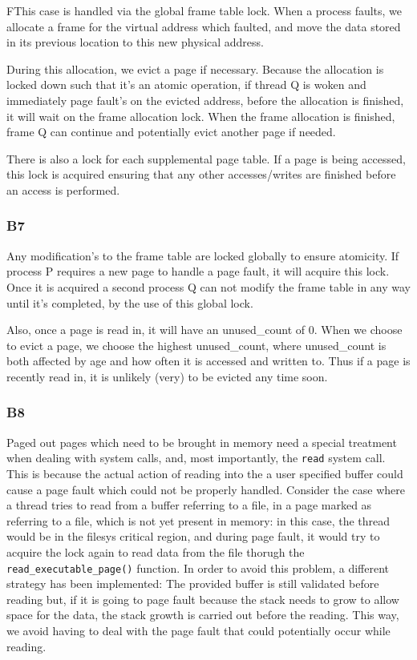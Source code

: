 \documentclass[a4wide, 11pt]{article}
\newcommand{\tx}{\texttt}
\begin{document}
FThis case is handled via the global frame table lock. When a process faults, we allocate a frame for the virtual address which faulted, and move the data stored in its previous location to this new physical address.

During this allocation, we evict a page if necessary. Because the allocation is locked down such that it's an atomic operation, if thread Q is woken and immediately page fault's on the evicted address, before the allocation is finished, it will wait on the frame allocation lock. When the frame allocation is finished, frame Q can continue and potentially evict another page if needed.

There is also a lock for each supplemental page table. If a page is being accessed, this lock is acquired ensuring that any other accesses/writes are finished before an access is performed.

\subsubsection{B7}

Any modification's to the frame table are locked globally to ensure atomicity. If process P requires a new page to handle a page fault, it will acquire this lock. Once it is acquired a second process Q can not modify the frame table in any way until it's completed, by the use of this global lock.

Also, once a page is read in, it will have an unused\_count of 0. When we choose to evict a page, we choose the highest unused\_count, where unused\_count is both affected by age and how often it is accessed and written to. Thus if a page is recently read in, it is unlikely (very) to be evicted any time soon.

\subsubsection{B8}
Paged out pages which need to be brought in memory need a special treatment when dealing with system calls, and, most importantly, the \tx{read} system call. This is because the actual action of reading into the a user specified buffer could cause a page fault which could not be properly handled. Consider the case where a thread tries to read from a buffer referring to a file, in a page marked as referring to a file, which is not yet present in memory: in this case, the thread would be in the filesys critical region, and during page fault, it would try to acquire the lock again to read data from the file thorugh the \tx{read\_executable\_page()} function. In order to avoid this problem, a different strategy has been implemented: The provided buffer is still validated before reading but, if it is going to page fault because the stack needs to grow to allow space for the data, the stack growth is carried out before the reading. This way, we avoid having to deal with the page fault that could potentially occur while reading.  
\end{document}
